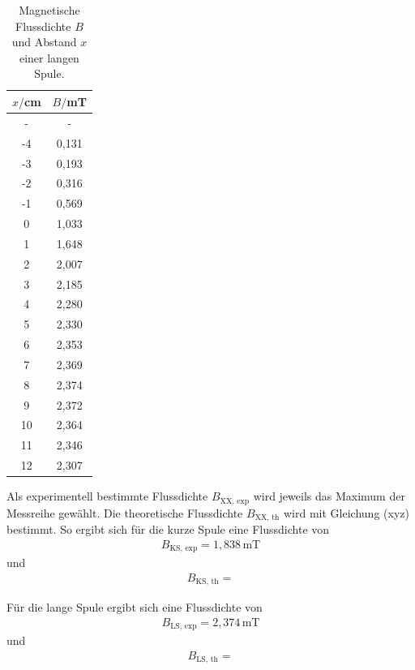 \begin{minipage}{0.5\textwidth}
\begin{table}[H]
  \centering
  \caption{Magnetische Flussdichte $B$ \\ und Abstand $x$ einer langen Spule.}
  \begin{tabular}{c c}
    \toprule
     $x/$cm & $B/$mT  \\
    \midrule
    - & - \\
    -4 & 0,131 \\
    -3 & 0,193 \\
    -2 & 0,316 \\
    -1 & 0,569 \\
    0 & 1,033\\
    1 & 1,648 \\
    2 & 2,007 \\
    3 & 2,185 \\
    4 & 2,280 \\
    5 & 2,330 \\
    6 & 2,353 \\
    7 & 2,369 \\
    8 & 2,374 \\
    9 & 2,372 \\
    10 & 2,364 \\
    11 & 2,346 \\
    12 & 2,307 \\
  \bottomrule
  \end{tabular}
\end{table}
\end{minipage}


Als experimentell bestimmte Flussdichte $B_\text{XX, exp}$ wird jeweils das Maximum der Messreihe gewählt.
Die theoretische Flussdichte $B_\text{XX, th}$ wird mit Gleichung (xyz) bestimmt.
So ergibt sich für die kurze Spule eine Flussdichte von 
\begin{align*}
B_\text{KS, exp} = 1,838\,\si{\milli\tesla}
\end{align*}
und
\begin{align*}
B_\text{KS, th} = 
\end{align*}

Für die lange Spule ergibt sich eine Flussdichte von 
\begin{align*}
B_\text{LS, exp} = 2,374\,\si{\milli\tesla}
\end{align*}
und
\begin{align*}
B_\text{LS, th} = 
\end{align*}

